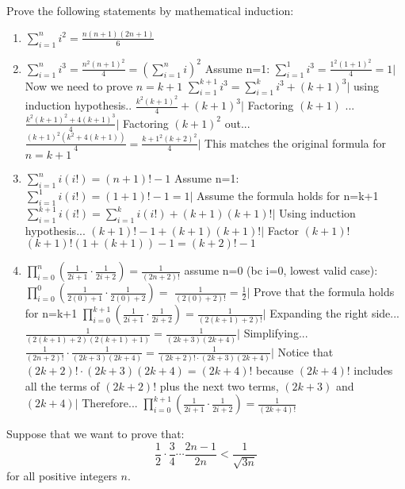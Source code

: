 \documentclass{article}
\begin{document}
	Prove the following statements by mathematical induction:
	\begin{enumerate}
		\item $\sum_{i=1}^{n} i^2 = \frac{n(n+1)(2n+1)}{6}$
		\subitem
		\item $\sum_{i=1}^{n} i^3 = \frac{n^2(n+1)^2}{4} = \left(\sum_{i=1}^{n} i\right)^2$
			\subitem Assume n=1: 
			\subitem$\sum_{i=1}^{1} i^3 = \frac{1^2(1+1)^2}{4} = 1| $ Now we need to prove $n = k+1$ 
		 	\subitem $\sum_{i=1}^{k+1} i^3 = \sum_{i=1}^{k} i^3 + (k+1)^3 | $ using induction hypothesis..
		  	\subitem $\frac{k^2(k+1)^2}{4} + (k+1)^3 | $ Factoring $(k+1)$ ... 
		  	\subitem $\frac{k^2(k+1)^2 + 4(k+1)^3}{4} | $ Factoring $(k+1)^2$ out... 
		  	\subitem $\frac{(k+1)^2(k^2+4(k+1))}{4} = \frac{k+1^2(k+2)^2}{4} | $ This matches the original formula for $n=k+1$  		 
		\item $\sum_{i=1}^{n} i(i!) = (n+1)! - 1$
		\subitem Assume n=1:
		\subitem $\sum_{i=1}^{1} i(i!) = (1+1)! - 1 = 1 | $ Assume the formula holds for n=k+1
		\subitem   $\sum_{i=1}^{k+1} i(i!)  = \sum_{i=1}^{k}i(i!)+(k+1)(k+1)! | $ Using induction hypothesis...
		\subitem $(k+1)!-1 + (k+1)(k+1)! |$ Factor $(k+1)!$ 
		\subitem $(k+1)!(1+(k+1))-1 = (k+2)!-1$ 
		
		
		\item $\prod_{i=0}^{n} \left(\frac{1}{2i+1} \cdot \frac{1}{2i+2}\right) = \frac{1}{(2n+2)!}$
		\subitem assume n=0 (bc i=0, lowest valid case):
		\subitem $\prod_{i=0}^{0} \left(\frac{1}{2(0)+1} \cdot \frac{1}{2(0)+2}\right) =$ $\frac{1}{(2(0)+2)!} = \frac{1}{2} | $ Prove that the formula holds for n=k+1 
		\subitem $\prod_{i=0}^{k+1} \left(\frac{1}{2i+1} \cdot \frac{1}{2i+2}\right) = \frac{1}{(2(k+1)+2)!} | $ Expanding the right side...
	 	\subitem $\frac{1}{(2(k+1)+2)(2(k+1)+1)} = \frac{1}{(2k+3)(2k+4)} | $ Simplifying... 
	 	\subitem $\frac{1}{(2n+2)!} \cdot \frac{1}{(2k+3)(2k+4)}  = \frac{1}{(2k+2)!\cdot(2k+3)(2k+4)} | $
	 	\subitem Notice that $(2k+2)! \cdot (2k+3)(2k+4) = (2k+4)!$ because $(2k+4)!$ includes all the terms of $(2k+2)!$ plus the next two terms, $(2k+3)$ and $(2k+4) | $ Therefore...
	 	\subitem $\prod_{i=0}^{k+1} \left(\frac{1}{2i+1} \cdot \frac{1}{2i+2}\right) = \frac{1}{(2k+4)!}$
	\end{enumerate}
	

	Suppose that we want to prove that:
	\[ \frac{1}{2} \cdot \frac{3}{4} \cdots \frac{2n-1}{2n} < \frac{1}{\sqrt{3n}} \]
	for all positive integers $n$.
	
\end{document}
